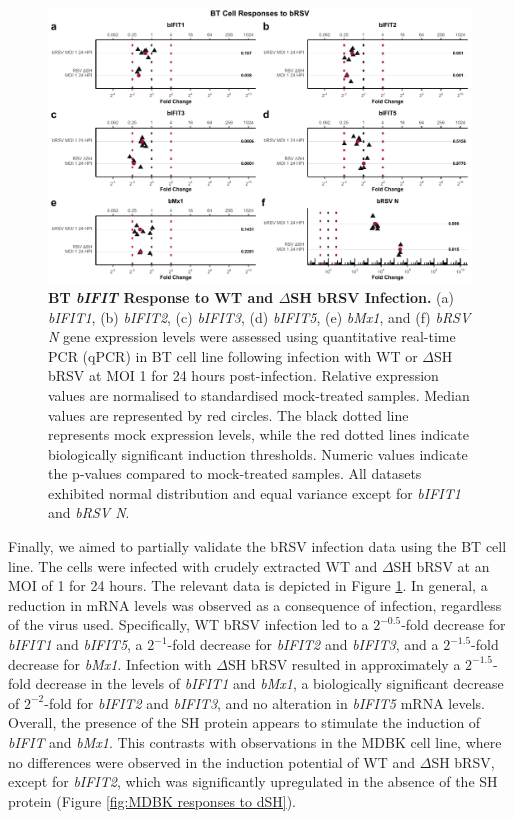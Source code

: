 \begin{figure}
    \centering
    \includegraphics[width=1\linewidth]{07. Chapter 2/Figs/02. Induction/09. bt_brsv.pdf}
    \caption[BT \textit{bIFIT} Response to WT and \(\Delta\)SH bRSV Infection.]{\textbf{BT \textit{bIFIT} Response to WT and \(\Delta\)SH bRSV Infection.} (a) \textit{bIFIT1}, (b) \textit{bIFIT2}, (c) \textit{bIFIT3}, (d) \textit{bIFIT5}, (e) \textit{bMx1}, and (f) \textit{bRSV N} gene expression levels were assessed using quantitative real-time PCR (qPCR) in BT cell line following infection with WT or \(\Delta\)SH bRSV at MOI 1 for 24 hours post-infection. Relative expression values are normalised to standardised mock-treated samples. Median values are represented by red circles. The black dotted line represents mock expression levels, while the red dotted lines indicate biologically significant induction thresholds. Numeric values indicate the p-values compared to mock-treated samples. All datasets exhibited normal distribution and equal variance except for \textit{bIFIT1} and \textit{bRSV N}.}
    \label{fig:BT responses to bRSV}
\end{figure}

Finally, we aimed to partially validate the bRSV infection data using the BT cell line. The cells were infected with crudely extracted WT and \(\Delta\)SH bRSV at an MOI of 1 for 24 hours. The relevant data is depicted in Figure \ref{fig:BT responses to bRSV}.  In general, a reduction in mRNA levels was observed as a consequence of infection, regardless of the virus used. Specifically, WT bRSV infection led to a \(2^{-0.5}\)-fold decrease for \textit{bIFIT1} and \textit{bIFIT5}, a \(2^{-1}\)-fold decrease for \textit{bIFIT2} and \textit{bIFIT3}, and a \(2^{-1.5}\)-fold decrease for \textit{bMx1}. Infection with \(\Delta\)SH bRSV resulted in approximately a \(2^{-1.5}\)-fold decrease in the levels of \textit{bIFIT1} and \textit{bMx1}, a biologically significant decrease of \(2^{-2}\)-fold for \textit{bIFIT2} and \textit{bIFIT3}, and no alteration in \textit{bIFIT5} mRNA levels. Overall, the presence of the SH protein appears to stimulate the induction of \textit{bIFIT} and \textit{bMx1}. This contrasts with observations in the MDBK cell line, where no differences were observed in the induction potential of WT and \(\Delta\)SH bRSV, except for \textit{bIFIT2}, which was significantly upregulated in the absence of the SH protein (Figure \ref{fig:MDBK responses to dSH}).

